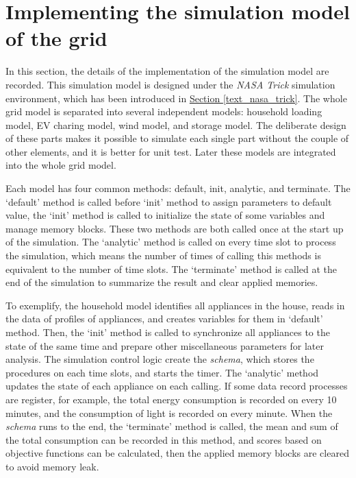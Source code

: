 \documentclass[12pt,a4paper]{report}
\begin{document}
            \section{Implementing the simulation model of the grid}
            
            In this section, the details of the implementation of the simulation model are recorded. This simulation model is designed under the \emph{NASA Trick} simulation environment, which has been introduced in \hyperref[text_nasa_trick]{Section \ref*{text_nasa_trick}}. The whole grid model is separated into several independent models: household loading model, EV charing model, wind model, and storage model. The deliberate design of these parts makes it possible to simulate each single part without the couple of other elements, and it is better for unit test. Later these models are integrated into the whole grid model.
            
            Each model has four common methods: default, init, analytic, and terminate. The `default' method is called before `init' method to assign parameters to default value, the `init' method is called to initialize the state of some variables and manage memory blocks. These two methods are both called once at the start up of the simulation. The `analytic' method is called on every time slot to process the simulation, which means the number of times of calling this methods is equivalent to the number of time slots. The `terminate' method is called at the end of the simulation to summarize the result and clear applied memories.
            
            To exemplify, the household model identifies all appliances in the house, reads in the data of profiles of appliances, and creates variables for them in `default' method. Then, the `init' method is called to synchronize all appliances to the state of the same time and prepare other miscellaneous parameters for later analysis. The simulation control logic create the \emph{schema}, which stores the procedures on each time slots, and starts the timer. The `analytic' method updates the state of each appliance on each calling. If some data record processes are register, for example, the total energy consumption is recorded on every 10 minutes, and the consumption of light is recorded on every minute.
            When the \emph{schema} runs to the end, the `terminate' method is called, the mean and sum of the total consumption can be recorded in this method, and scores based on objective functions can be calculated, then the applied memory blocks are cleared to avoid memory leak.
\end{document}
